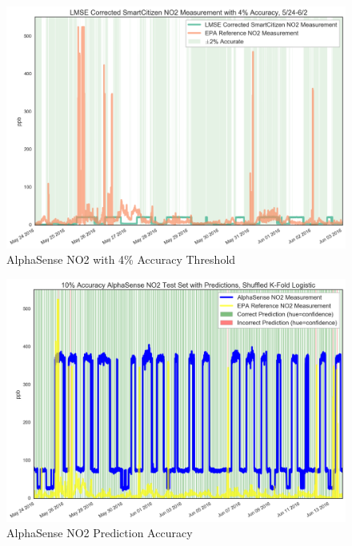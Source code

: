 \begin{figure}[htb]
 	\includegraphics[width=\textwidth]{figs/as_no2_with_4_accuracy_zoomed}               
 	 \caption{AlphaSense NO2 with 4\% Accuracy Threshold}
  	\label{fig:as_no2_with_4_accuracy_zoomed}
\end{figure}


\begin{figure}[htb]
 	\includegraphics[width=\textwidth]{figs/as_no2_10_logistic_predictions}               
 	 \caption{AlphaSense NO2 Prediction Accuracy}
  	\label{fig:as_no2_10_logistic_predictions}
\end{figure}


